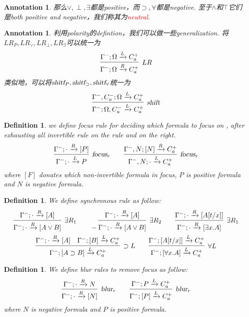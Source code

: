 \documentclass{article}
\theoremstyle{plain}
\newtheorem{definition}[theorem]{Definition}
\newtheorem{annotation}[theorem]{Annotation}
\theoremstyle{nonumberplain}
\newcommand{\redt}[1]{\textcolor{red}{#1}}
\begin{document}
\begin{annotation}
\rm 那么$\vee, \perp, \exists$都是positive，而$\supset, \forall$都是negative. 至于$\wedge$和$\top$它们是both positive and negative，我们称其为\redt{neutral}.
\end{annotation}


\begin{annotation}
\rm 利用polarity的defintion，我们可以做一些generalization. 将$LR_P, LR_\vee, LR_\perp, LR_\exists$可以统一为
\[
\infer[LR]{\Gamma^-;\Omega \xrightarrow{R} C_a^+}{\Gamma^-;\Omega \xrightarrow{L} C_a^+}
\]
类似地，可以将$\textsl{shitf}_P, \textsl{shitf}_\supset, \textsl{shitf}_\forall$统一为
$$
\infer[\textsl{shift}]{\Gamma^-;\Omega, C_a^- \xrightarrow{L} C_a^+}{\Gamma^-,C_a^-;\Omega \xrightarrow{L} C_a^+}
$$
\end{annotation}

\begin{definition}
\rm we define \textsl{focus} rule for deciding which formula to focus on , after exhausting all invertible rule on the rule and on the right. 
\[
\infer[\textsl{focus}_r]{\Gamma^-;\cdot \xrightarrow{L} P}{\Gamma^-;\cdot \xrightarrow{R} [P]} \quad \quad  \infer[\textsl{focus}_r]{\Gamma^-, N;\cdot \xrightarrow{L} C_a^+}{\Gamma^-, N; [N] \xrightarrow{R} C_a^+}
\]
where $[F]$ donates which non-invertible formula in focus, $P$ is positive formula and $N$ is negative formula. 
\end{definition}

\begin{definition}\label{synchronous-rule-in-focus-calculus}
\rm We define \emph{synchronous} rule as follow:
\[
\begin{gathered}
\infer[\exists R_1]{\Gamma^-;\cdot \xrightarrow{R} [A \vee B]}{\Gamma^-;\cdot \xrightarrow{R}[A]} \quad\quad
-\infer[\exists R_2]{\Gamma^-;\cdot \xrightarrow{R} [A \vee B]}{\Gamma^-;\cdot \xrightarrow{R} [A]} \quad\quad
\infer[\exists R_1]{\Gamma^-;\cdot \xrightarrow{R} [\exists x.A]}{\Gamma^-;\cdot \xrightarrow{R} [A[t/x]]} \\
\infer[\supset L]{\Gamma^-;[A\supset B] \xrightarrow{L} C_a^+}{\Gamma^-;\cdot \xrightarrow{R} [A] & \Gamma^-;[B] \xrightarrow{L} C_a^+} \quad\quad
\infer[\forall L]{\Gamma^-;[\forall x.A] \xrightarrow{L} C_a^+ }{\Gamma^-;[A[t/x]] \xrightarrow{L} C_a^+ }
\end{gathered}
\]
\end{definition}

\begin{definition}
\rm We define \textsl{blur} rules to remove focus as follow:
\[
\infer[\textsl{blur}_r]{\Gamma^-;\cdot \xrightarrow{R} [N]}{\Gamma^-;\cdot \xrightarrow{R} N} \quad\quad 
\infer[\textsl{blur}_r]{\Gamma^-;[P] \xrightarrow{L} C_a^+}{\Gamma^-; P \xrightarrow{L} C_a^+}
\]
where $N$ is negative formula and $P$ is positive formula.
\end{definition}
\end{document}
